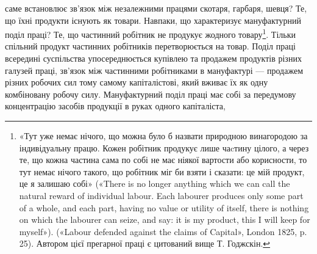 саме встановлює зв’язок між незалежними працями скотаря,
гарбаря, шевця? Те, що їхні продукти існують як товари. Навпаки,
що характеризує мануфактурний поділ праці? Те, що
частинний робітник не продукує жодного товару\footnote{
«Тут уже немає нічого, що можна було б назвати природною винагородою
за індивідуальну працю. Кожен робітник продукує лише чаcтину
цілого, а через те, що кожна частина сама по собі не має ніякої
вартости або корисности, то тут немає нічого такого, що робітник міг би
взяти і сказати: це мій продукт, це я залишаю собі» («There is no longer
anything which we can call the natural reward of individual labour.
Each labourer produces only some part of a whole, and each part, having no
value or utility of itself, there is nothing on which the labourer can seize,
and say: it is my product, this I will keep for myself»). («Labour defended
against the claims of Capital», London 1825, p. 25). Автором цієї
прегарної праці є цитований вище Т. Годжскін.
}. Тільки спільний
продукт частинних робітників перетворюється на товар. Поділ праці всередині суспільства упосереднюється купівлею та
продажем продуктів різних галузей праці, зв’язок між частинними
робітниками в мануфактурі — продажем різних робочих
сил тому самому капіталістові, який вживає їх як одну комбіновану
робочу силу. Мануфактурний поділ праці має собі за передумову
концентрацію засобів продукції в руках одного капіталіста,
